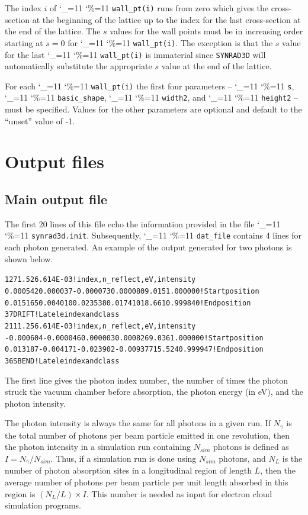 \documentclass[11pt]{article}
\newcommand{\srthree}{\texttt{SYNRAD3D}\xspace}
\newcommand\ttcmd{\begingroup\catcode`\_=11 \catcode`\%=11 \dottcmd}
\newcommand\dottcmd[1]{\texttt{#1}\endgroup}
\newcommand{\vn}{\ttcmd}
\newlength{\ExBeg}
\newlength{\ExEnd}
\newenvironment{example}
  {\vspace{\ExBeg} \begin{alltt}}
  {\end{alltt} \vspace{\ExEnd}}
\begin{document}
The index $i$ of \vn{wall_pt(i)} runs from zero which gives the
cross-section at the beginning of the lattice up to the index for the
last cross-section at the end of the lattice. The $s$ values for the
wall points must be in increasing order starting at $s = 0$ for
\vn{wall_pt(i)}. The exception is that the $s$ value for the last
\vn{wall_pt(i)} is immaterial since \srthree will automatically substitute
the appropriate $s$ value at the end of the lattice.

For each \vn{wall_pt(i)} the first four parameters -- \vn{s},
\vn{basic_shape}, \vn{width2}, and \vn{height2} -- must be
specified. Values for the other parameters are optional and default to
the ``unset'' value of -1.

\section{Output files} 

\subsection{Main output file}
The first 20 lines of this file echo the
information provided in the file \vn{synrad3d.init}.
Subsequently, \vn{dat_file} contains 4 lines for each photon
generated. An example of the output generated for two photons is shown
below.
\begin{example}
 1       2     71.52  6.614E-03  ! index, n_reflect, eV, intensity
    0.000542    0.000037   -0.000073    0.000080       9.015    1.000000  ! Start position
    0.015165    0.004010    0.023538    0.017410      18.661    0.999840  ! End position
      37   DRIFT             ! Lat ele index and class
       2       1     11.25  6.614E-03  ! index, n_reflect, eV, intensity
   -0.000604   -0.000046    0.000003    0.000826       9.036    1.000000  ! Start position
    0.013187   -0.004171   -0.023902   -0.009377      15.524    0.999947  ! End position
      36   SBEND             ! Lat ele index and class
\end{example}
The first line gives the photon index number, the number of times the
photon struck the vacuum chamber before absorption, the photon energy
(in eV), and the photon intensity.

The photon intensity is always the same for all photons in a given
run. If $N_{\gamma}$ is the total number of photons per beam particle
emitted in one revolution, then the photon intensity in a simulation
run containing $N_{sim}$ photons is defined as $I=N_{\gamma}/N_{sim}.$
Thus, if a simulation run is done using $N_{sim}$ photons, and $N_L$
is the number of photon absorption sites in a longitudinal region of
length $L$, then the average number of photons per beam particle per
unit length absorbed in this region is $(N_L/L)\times I.$ This number
is needed as input for electron cloud simulation programs.
\end{document}
